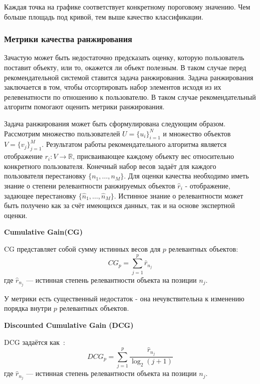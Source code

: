 Каждая точка на графике соответствует конкретному пороговому значению.
Чем больше площадь под кривой, тем выше качество классификации.


\subsubsection{Метрики качества ранжирования}
Зачастую может быть недостаточно предсказать оценку, которую пользователь поставит объекту, или то, окажется ли объект полезным.
В таком случае перед рекомендательной системой ставится задача ранжирования.
Задача ранжирования заключается в том, чтобы отсортировать набор элементов исходя из их релевенатности по отношению к пользователю.
В таком случае рекомендательный алгоритм помогают оценить метрики ранжирования.

Задача ранжирования может быть сформулирована следующим образом.
Рассмотрим множество пользователей $U = \{u_i\}_{i=1}^{N}$ и множество объектов $V = \{v_j\}_{j=1}^{M}$.
Результатом работы рекомендательного алгоритма является отображение $r_i: V \to \mathbb{R}$, присваивающее каждому объекту вес относительно конкретного пользователя.
Конечный набор весов задаёт для каждого пользователя перестановку $\{n_1, \dots, n_M\}$.
Для оценки качества необходимо иметь знание о степени релевантности ранжируемых объектов $\hat{r}_i$ - отображение, задающее перестановку $\{\hat{n}_1, \dots, \hat{n}_M\}$.
Истинное знание о релевантности может быть получено как за счёт имеющихся данных, так и на основе экспертной оценки.

\vspace{1em}
\textbf{Cumulative Gain(CG)}

CG представляет собой сумму истинных весов для $p$ релевантных объектов:
\begin{equation}\label{eq:cg}
CG_p = \sum_{j=1}^{p}\hat{r}_{n_j}
\end{equation}
где $\hat{r}_{n_j}$ --- истинная степень релевантности объекта на позиции $n_j$.

У метрики есть существенный недостаток - она нечувствительна к изменению порядка внутри $p$ релевантных объектов.

\vspace{1em}
\textbf{Discounted Cumulative Gain (DCG)}

DCG задаётся как~\cite{dcg}:
\begin{equation}\label{eq:dcg}
DCG_p = \sum_{j=1}^{p}\frac{\hat{r}_{n_j}}{\log_2 (j + 1)}
\end{equation}
где $\hat{r}_{n_j}$ --- истинная степень релевантности объекта на позиции $n_j$.

